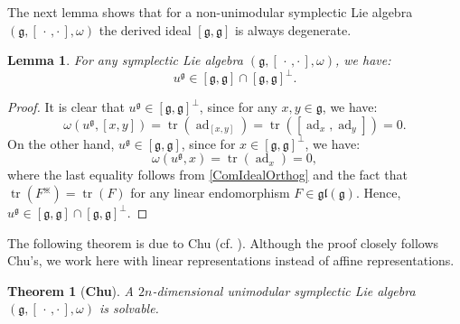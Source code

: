 \documentclass[final,1p,times,nopreprintline]{elsarticle}
\newtheorem{theorem}{Theorem}[section]
\newtheorem{lemma}{Lemma}[section]
\theoremstyle{definition}
\numberwithin{equation}{section}
\newcommand{\w}{\omega}
\newcommand{\tr}{\operatorname{tr}}
\newcommand{\g}{\mathfrak{g}}
\newcommand{\ad}{\operatorname{ad}}
\numberwithin{equation}{section}
\newcommand{\gl}{\mathfrak{gl}}
\begin{document}
The next lemma shows that for a non-unimodular symplectic Lie algebra $(\g,[\,\cdot\,,\cdot\,],\w)$ the derived ideal $[\g,\g]$ is always degenerate.

\begin{lemma}\label{lema[g,g]degenerate}
	For any symplectic Lie algebra $(\g,[\,\cdot\,,\cdot\,],\w)$, we have:
	\begin{equation*}
		u^\g\in[\g,\g]\cap [\g,\g]^\perp.
	\end{equation*}
\end{lemma}

\begin{proof}
	It is clear that $u^\g\in[\g,\g]^\perp$, since for any $x,y\in\g$, we have:
	\begin{equation*}
		\w(u^\g,[x,y])=\tr(\ad_{[x,y]})=\tr\left([\ad_x,\ad_y]\right)=0.
	\end{equation*}
	On the other hand, $u^\g\in [\g,\g]$, since for $x\in[\g,\g]^\perp$, we have:
	\begin{equation*}
		\omega\left(u^\mathfrak{g},x\right)=\tr\left(\ad_x\right)=0,
	\end{equation*}
	where the last equality follows from \eqref{ComIdealOrthog} and the fact that $\tr(F^\divideontimes)=\tr(F)$ for any linear endomorphism $F\in\gl(\g)$. Hence, $u^\g\in[\g,\g]\cap [\g,\g]^\perp$. 
\end{proof}

The following theorem is due to Chu (cf. \cite[p. 157]{Chu}). Although the proof closely follows Chu's, we work here with linear representations instead of affine representations.

\begin{theorem}[\bf Chu]\label{Chu'sTh}
	A $2n$-dimensional unimodular symplectic Lie algebra $(\g,[\,\cdot\,,\cdot\,],\w)$ is solvable.
\end{theorem}
\end{document}
